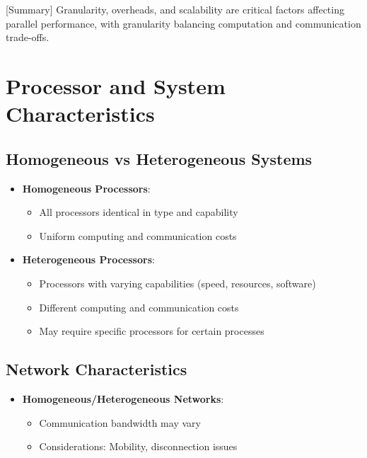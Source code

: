 \documentclass[12pt]{article}
\begin{document}
[Summary] Granularity, overheads, and scalability are critical factors affecting parallel performance, with granularity balancing computation and communication trade-offs.

\section{Processor and System Characteristics}

\subsection{Homogeneous vs Heterogeneous Systems}
\begin{itemize}
  \item \textbf{Homogeneous Processors}:
        \begin{itemize}
          \item All processors identical in type and capability
          \item Uniform computing and communication costs
        \end{itemize}

  \item \textbf{Heterogeneous Processors}:
        \begin{itemize}
          \item Processors with varying capabilities (speed, resources, software)
          \item Different computing and communication costs
          \item May require specific processors for certain processes
        \end{itemize}
\end{itemize}

\subsection{Network Characteristics}
\begin{itemize}
  \item \textbf{Homogeneous/Heterogeneous Networks}:
        \begin{itemize}
          \item Communication bandwidth may vary
          \item Considerations: Mobility, disconnection issues
        \end{itemize}
\end{itemize}
\end{document}
